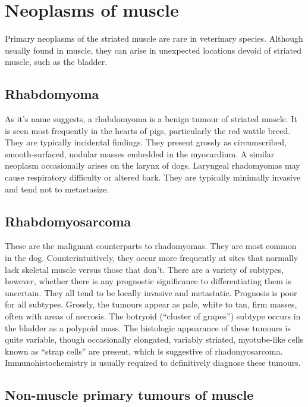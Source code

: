 \documentclass[openany]{book}
\begin{document}
\chapter{Neoplasms of muscle}\label{neoplasms-of-muscle}

Primary neoplasms of the striated muscle are rare in veterinary species.
Although usually found in muscle, they can arise in unexpected locations
devoid of striated muscle, such as the bladder.

\section{Rhabdomyoma}\label{rhabdomyoma}

As it's name suggests, a rhabdomyoma is a benign tumour of striated
muscle. It is seen most frequently in the hearts of pigs, particularly
the red wattle breed. They are typically incidental findings. They
present grossly as circumscribed, smooth-surfaced, nodular masses
embedded in the myocardium. A similar neoplasm occasionally arises on
the larynx of dogs. Laryngeal rhadomyomas may cause respiratory
difficulty or altered bark. They are typically minimally invasive and
tend not to metastasize.

\section{Rhabdomyosarcoma}\label{rhabdomyosarcoma}

These are the malignant counterparts to rhadomyomas. They are most
common in the dog. Counterintuitively, they occur more frequently at
sites that normally lack skeletal muscle versus those that don't. There
are a variety of subtypes, however, whether there is any prognostic
significance to differentiating them is uncertain. They all tend to be
locally invasive and metastatic. Prognosis is poor for all subtypes.
Grossly, the tumours appear as pale, white to tan, firm masses, often
with areas of necrosis. The botryoid (``cluster of grapes'') subtype
occurs in the bladder as a polypoid mass. The histologic appearance of
these tumours is quite variable, though occasionally elongated, variably
striated, myotube-like cells known as ``strap cells'' are present, which
is suggestive of rhadomyosarcoma. Immunohistochemistry is usually
required to definitively diagnose these tumours.

\section{Non-muscle primary tumours of
muscle}\label{non-muscle-primary-tumours-of-muscle}
\end{document}
